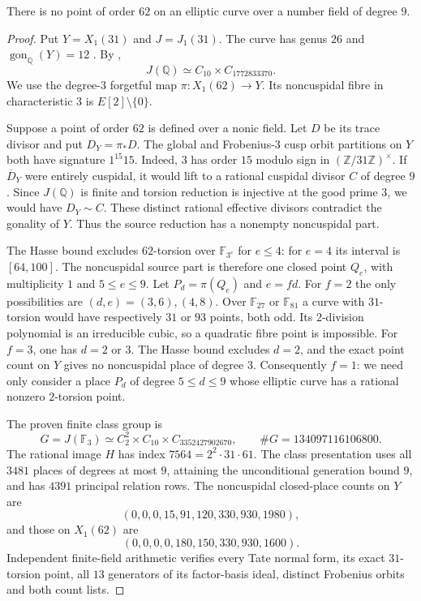 \begin{proposition}\label{prop:nonic-no62}
There is no point of order $62$ on an elliptic curve over a number
field of degree $9$.
\end{proposition}
\begin{proof}
Put $Y=X_1(31)$ and $J=J_1(31)$. The curve has genus $26$ and
$\operatorname{gon}_{\mathbb Q}(Y)=12$ \cite{DvH}. By
\cite[Theorem~3.1(2), Theorem~4.13 and Table~2]{DEHMZ},
\[
 J(\mathbb Q)\simeq C_{10}\times C_{1772833370}.
\]
We use the degree-$3$ forgetful map $\pi:X_1(62)\to Y$.
Its noncuspidal fibre in characteristic $3$ is
$E[2]\setminus\{0\}$.

Suppose a point of order $62$ is defined over a nonic field.
Let $D$ be its trace divisor and put $D_Y=\pi_*D$.
The global and Frobenius-$3$ cusp orbit partitions on $Y$ both
have signature $1^{15}15$. Indeed, $3$ has order $15$ modulo
sign in $(\mathbb Z/31\mathbb Z)^\times$.
If $\overline D_Y$ were entirely cuspidal, it would lift to a
rational cuspidal divisor $C$ of degree $9$.
Since $J(\mathbb Q)$ is finite and torsion reduction is injective
at the good prime $3$, we would have $D_Y\sim C$.
These distinct rational effective divisors contradict the gonality
of $Y$. Thus the source reduction has a nonempty noncuspidal part.

The Hasse bound excludes $62$-torsion over $\mathbb F_{3^e}$ for
$e\le4$: for $e=4$ its interval is $[64,100]$.
The noncuspidal source part is therefore one closed point $Q_e$,
with multiplicity $1$ and $5\le e\le9$.
Let $P_d=\pi(Q_e)$ and $e=fd$.
For $f=2$ the only possibilities are $(d,e)=(3,6),(4,8)$.
Over $\mathbb F_{27}$ or $\mathbb F_{81}$ a curve with $31$-torsion
would have respectively $31$ or $93$ points, both odd.
Its $2$-division polynomial is an irreducible cubic, so a quadratic
fibre point is impossible. For $f=3$, one has $d=2$ or $3$.
The Hasse bound excludes $d=2$, and the exact point count on $Y$
gives no noncuspidal place of degree $3$.
Consequently $f=1$: we need only consider a place $P_d$ of degree
$5\le d\le9$ whose elliptic curve has a rational nonzero
$2$-torsion point.

The proven finite class group is
\[
 G=J(\mathbb F_3)\simeq C_2^2\times C_{10}\times C_{3352427902670},
 \qquad\#G=134097116106800.
\]
The rational image $H$ has index $7564=2^2\cdot31\cdot61$.
The class presentation uses all $3481$ places of degrees at most
$9$, attaining the unconditional generation bound $9$, and has
$4391$ principal relation rows.
The noncuspidal closed-place counts on $Y$ are
\[
 (0,0,0,15,91,120,330,930,1980),
\]
and those on $X_1(62)$ are
\[
 (0,0,0,0,180,150,330,930,1600).
\]
Independent finite-field arithmetic verifies every Tate normal
form, its exact $31$-torsion point, all $13$ generators of its
factor-basis ideal, distinct Frobenius orbits and both count lists.


\end{proof}
